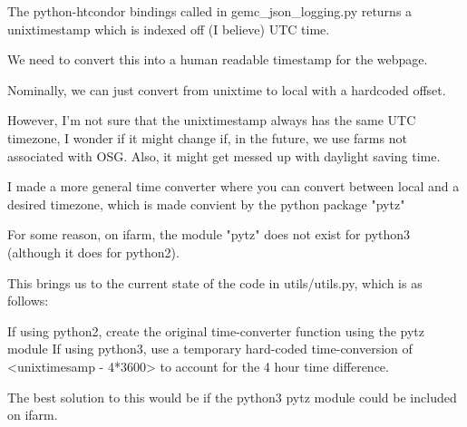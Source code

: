 The python-htcondor bindings called in gemc_json_logging.py returns a unixtimestamp which is indexed off (I believe) UTC time. 

We need to convert this into a human readable timestamp for the webpage.

Nominally, we can just convert from unixtime to local with a hardcoded offset.

However, I'm not sure that the unixtimestamp always has the same UTC timezone, I wonder if it might change if, in the future, we use farms not associated with OSG.
Also, it might get messed up with daylight saving time.

I made a more general time converter where you can convert between local and a desired timezone, which is made convient by the python package "pytz"

For some reason, on ifarm, the module "pytz" does not exist for python3 (although it does for python2). 

This brings us to the current state of the code in utils/utils.py, which is as follows:

If using python2, create the original time-converter function using the pytz module
If using python3, use a temporary hard-coded time-conversion of <unixtimesamp - 4*3600> to account for the 4 hour time difference.

The best solution to this would be if the python3 pytz module could be included on ifarm.
